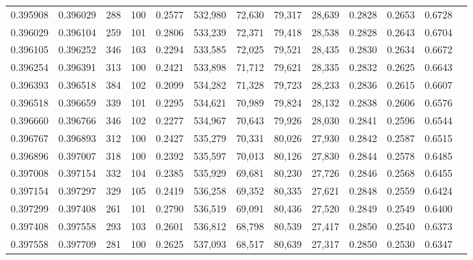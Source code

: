 \begin{tabular}{rrrrrrrrrrrrr}
0.395908 & 0.396029 &   288 & 100 &                                     0.2577 & 532,980 &  72,630 &  79,317 &  28,639 & 0.2828 & 0.2653 & 0.6728 \\
0.396029 & 0.396104 &   259 & 101 &                                     0.2806 & 533,239 &  72,371 &  79,418 &  28,538 & 0.2828 & 0.2643 & 0.6704 \\
0.396105 & 0.396252 &   346 & 103 &                                     0.2294 & 533,585 &  72,025 &  79,521 &  28,435 & 0.2830 & 0.2634 & 0.6672 \\
0.396254 & 0.396391 &   313 & 100 &                                     0.2421 & 533,898 &  71,712 &  79,621 &  28,335 & 0.2832 & 0.2625 & 0.6643 \\
0.396393 & 0.396518 &   384 & 102 &                                     0.2099 & 534,282 &  71,328 &  79,723 &  28,233 & 0.2836 & 0.2615 & 0.6607 \\
0.396518 & 0.396659 &   339 & 101 &                                     0.2295 & 534,621 &  70,989 &  79,824 &  28,132 & 0.2838 & 0.2606 & 0.6576 \\
0.396660 & 0.396766 &   346 & 102 &                                     0.2277 & 534,967 &  70,643 &  79,926 &  28,030 & 0.2841 & 0.2596 & 0.6544 \\
0.396767 & 0.396893 &   312 & 100 &                                     0.2427 & 535,279 &  70,331 &  80,026 &  27,930 & 0.2842 & 0.2587 & 0.6515 \\
0.396896 & 0.397007 &   318 & 100 &                                     0.2392 & 535,597 &  70,013 &  80,126 &  27,830 & 0.2844 & 0.2578 & 0.6485 \\
0.397008 & 0.397154 &   332 & 104 &                                     0.2385 & 535,929 &  69,681 &  80,230 &  27,726 & 0.2846 & 0.2568 & 0.6455 \\
0.397154 & 0.397297 &   329 & 105 &                                     0.2419 & 536,258 &  69,352 &  80,335 &  27,621 & 0.2848 & 0.2559 & 0.6424 \\
0.397299 & 0.397408 &   261 & 101 &                                     0.2790 & 536,519 &  69,091 &  80,436 &  27,520 & 0.2849 & 0.2549 & 0.6400 \\
0.397408 & 0.397558 &   293 & 103 &                                     0.2601 & 536,812 &  68,798 &  80,539 &  27,417 & 0.2850 & 0.2540 & 0.6373 \\
0.397558 & 0.397709 &   281 & 100 &                                     0.2625 & 537,093 &  68,517 &  80,639 &  27,317 & 0.2850 & 0.2530 & 0.6347 \\

\end{tabular}
